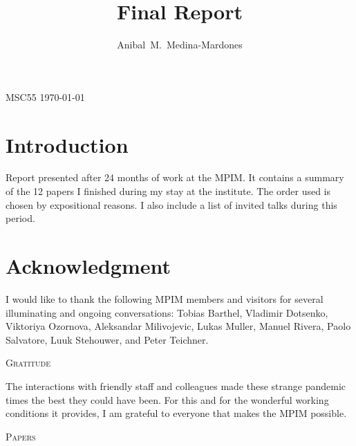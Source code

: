 \documentclass{amsart}
\title[Final Report]{Final Report}
\author[Final report]{Anibal~M.~Medina-Mardones}
\begin{document}
\noindent MSC55 \hfill \today
\vskip30pt
\maketitle

\thispagestyle{empty}

\section*{Introduction}

Report presented after 24 months of work at the MPIM.
It contains a summary of the 12 papers I finished during my stay at the institute.
The order used is chosen by expositional reasons.
I also include a list of invited talks during this period.

\bigskip
\section*{Acknowledgment}

I would like to thank the following MPIM members and visitors for several illuminating and ongoing conversations: Tobias Barthel, Vladimir Dotsenko, Viktoriya Ozornova, Aleksandar Milivojevic, Lukas Muller, Manuel Rivera, Paolo Salvatore, Luuk Stehouwer, and Peter Teichner.

\begin{center}
	\bigskip
	\vskip3.5pt
	\textsc{Gratitude}
	\smallskip
\end{center}

The interactions with friendly staff and colleagues made these strange pandemic times the best they could have been.
For this and for the wonderful working conditions it provides, I am grateful to everyone that makes the MPIM possible.

\begin{center}
	\bigskip
	\vskip3.5pt
	\textsc{Papers}
	\smallskip
\end{center}
\end{document}
